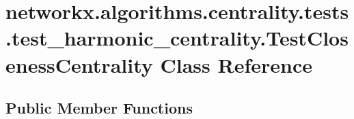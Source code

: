 \hypertarget{classnetworkx_1_1algorithms_1_1centrality_1_1tests_1_1test__harmonic__centrality_1_1TestClosenessCentrality}{}\section{networkx.\+algorithms.\+centrality.\+tests.\+test\+\_\+harmonic\+\_\+centrality.\+Test\+Closeness\+Centrality Class Reference}
\label{classnetworkx_1_1algorithms_1_1centrality_1_1tests_1_1test__harmonic__centrality_1_1TestClosenessCentrality}
\subsection*{Public Member Functions}
